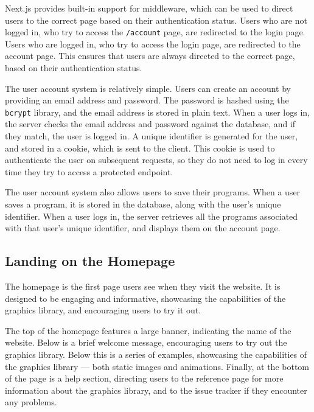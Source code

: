 \documentclass[../main.tex]{subfiles}
\begin{document}
            Next.js provides built-in support for middleware, which can be used to direct
                users to the correct page based on their authentication status.
            Users who are not logged in, who try to access the \texttt{/account} page, are
                redirected to the login page.
            Users who are logged in, who try to access the login page, are redirected to
                the account page.
            This ensures that users are always directed to the correct page, based on their
                authentication status.

            The user account system is relatively simple.
            Users can create an account by providing an email address and password.
            The password is hashed using the \texttt{bcrypt} library, and the email address
                is stored in plain text.
            When a user logs in, the server checks the email address and password against
                the database, and if they match, the user is logged in.
            A unique identifier is generated for the user, and stored in a cookie, which is
                sent to the client.
            This cookie is used to authenticate the user on subsequent requests, so they do
                not need to log in every time they try to access a protected endpoint.

            The user account system also allows users to save their programs.
            When a user saves a program, it is stored in the database, along with the
                user's unique identifier.
            When a user logs in, the server retrieves all the programs associated with that
                user's unique identifier, and displays them on the account page.

        \subsection{Landing on the Homepage}
            The homepage is the first page users see when they visit the website.
            It is designed to be engaging and informative, showcasing the capabilities of
                the graphics library, and encouraging users to try it out.

            The top of the homepage features a large banner, indicating the name of the
                website.
            Below is a brief welcome message, encouraging users to try out the graphics
                library.
            Below this is a series of examples, showcasing the capabilities of the graphics
                library — both static images and animations.
            Finally, at the bottom of the page is a help section, directing users to the
                reference page for more information about the graphics library, and to the
                issue tracker if they encounter any problems.
\end{document}
